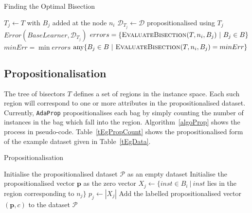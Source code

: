 \documentclass[a4paper,12pt]{article} %
\newcommand{\AdaProp}{\texttt{AdaProp}\xspace}
\newcommand{\mcl}[1]{\mathcal{#1}}
\newcommand{\vect}[1]{\boldsymbol{#1}}
\begin{document}
\begin{algorithm}
\caption{Finding the Optimal Bisection}
\label{algoOptBisector} 
\begin{algorithmic}
    \State $T_j \gets T$ with $B_j$ added at the node $n_i$
        \State $\mcl{D}_{T_j} \gets \mcl{D}$ propositionalised using $T_j$
        \State \Return $Error(BaseLearner,\mcl{D}_{T_j})$
    \EndFunction
    \State 
    \State $errors = \{ \textrm{\sc EvaluateBisection}(T,n_i,B_j) ~|~ B_j \in B \}$
    \State $minErr = \min errors$
    \State \Return $\textrm{any} \{ B_j \in B ~|~ \textrm{\sc EvaluateBisection}(T,n_i,B_j) = minErr \}$
    \EndFunction
\end{algorithmic}
\end{algorithm}

\subsection{Propositionalisation}
\label{secProp}

The tree of bisectors $T$ defines a set of regions in the instance space.
Each such region will correspond to one or more attributes 
    in the propositionalised dataset.
Currently, \AdaProp propositionalises each bag 
    by simply counting the number of instances in the bag which fall into the region.
Algorithm~\ref{algoProp} shows the process in pseudo-code.
Table~\ref{tEgPropCount} shows the propositionalised form of 
    the example dataset given in Table~\ref{tEgData}.

\begin{algorithm}
\caption{Propositionalisation}
\label{algoProp} 
    \begin{algorithmic}
    \State Initialise the propositionalised dataset $\mcl{P}$ as an empty dataset
    \ForAll{bags $(B_i,c) \in \mcl{D}$}
        \State Initialise the propositionalised vector $\vect{p}$ as the zero vector
            \State $X_j \gets \{ inst \in B_i ~|~ inst$ 
                lies in the region corresponding to $n_j \} $
            \State $p_{j} \gets | X_j |$
        \EndFor
        \State Add the labelled propositionalised vector $(\vect{p},c)$ 
            to the dataset $\mcl{P}$
    \EndFor
    \end{algorithmic}
\end{algorithm}
    
\end{document}
